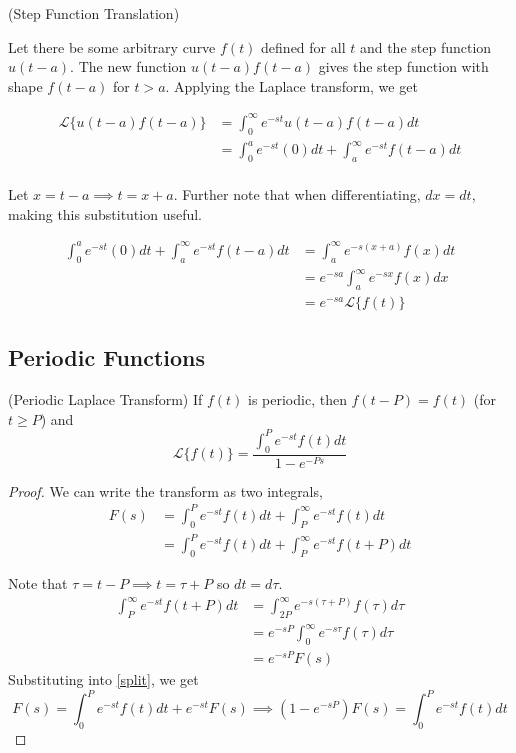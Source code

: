 \begin{definition}(Step Function Translation)

    Let there be some arbitrary curve $f(t)$ defined for all $t$ and the step function $u(t-a)$.
    The new function $u(t-a)f(t-a)$ gives the step function with shape $f(t-a)$ for $t>a$. Applying the Laplace transform, we get

    \begin{align*}
        \mathcal{L}\{u(t-a)f(t-a)\}&=\int_0^\infty e^{-st}u(t-a)f(t-a)dt\\
        &=\int_0^a e^{-st}(0)dt+\int_a^\infty e^{-st}f(t-a)dt\\
    \end{align*}

    Let $x=t-a\implies t=x+a$. Further note that when differentiating, $dx=dt$, making this substitution useful.

    \begin{align*}
        \int_0^a e^{-st}(0)dt+\int_a^\infty e^{-st}f(t-a)dt&=\int_a^\infty e^{-s(x+a)}f(x)dt\\
        &=e^{-sa}\int_a^\infty e^{-sx}f(x)dx\\
        &=e^{-sa}\mathcal{L}\{f(t)\}
    \end{align*}
\end{definition}

\subsection{Periodic Functions}

\begin{definition} (Periodic Laplace Transform)
    If $f(t)$ is periodic, then $f(t-P)=f(t)$ (for $t\geq P$) and
    \begin{equation}
        \mathcal{L}\{f(t)\} = \displaystyle\frac{\int_0^Pe^{-st}f(t)dt}{1-e^{-Ps}}
    \end{equation}
\end{definition}

\begin{proof}
    We can write the transform as two integrals,
    \begin{align}
        F(s)&=\int_0^P e^{-st}f(t)dt + \int_P^\infty e^{-st}f(t)dt\\
        &= \int_0^P e^{-st}f(t)dt + \int_P^\infty e^{-st}f(t+P)dt\label{split}
    \end{align}

    Note that $\tau = t-P\implies t=\tau +P$ so $dt = d\tau$.
    \begin{align}
        \int_P^\infty e^{-st}f(t+P)dt &= \int_{2P}^\infty e^{-s(\tau + P)}f(\tau)d\tau\\
        &= e^{-sP}\int_{0}^\infty e^{-s\tau}f(\tau)d\tau\\
        &= e^{-sP}F(s)
    \end{align}
    Substituting into \ref{split}, we get
    \begin{equation}
        F(s)=\int_0^P e^{-st}f(t)dt + e^{-st}F(s)\implies (1-e^{-sP})F(s)=\int_0^P e^{-st}f(t)dt
    \end{equation}
\end{proof}

